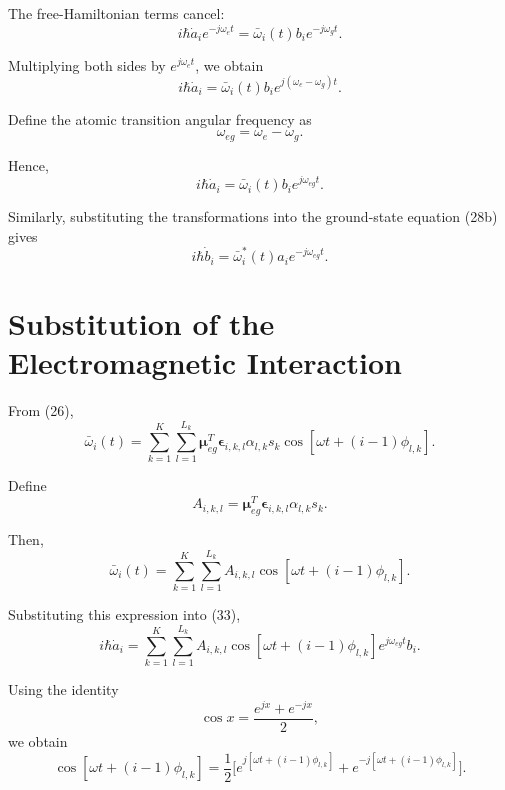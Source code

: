 \documentclass[12pt,a4paper]{article}
\begin{document}
The free-Hamiltonian terms cancel:
\[
i\hbar\dot a_i e^{-j\omega_e t}
=
\bar{\omega}_i(t)b_i e^{-j\omega_g t}.
\]

Multiplying both sides by
\(e^{j\omega_e t}\),
we obtain
\[
i\hbar\dot a_i
=
\bar{\omega}_i(t)b_i
e^{j(\omega_e-\omega_g)t}.
\]

Define the atomic transition angular frequency as
\begin{equation}
\boxed{
\omega_{eg}
=
\omega_e-\omega_g.
}
\tag{32}
\end{equation}

Hence,
\begin{equation}
\boxed{
i\hbar\dot a_i
=
\bar{\omega}_i(t)
b_i
e^{j\omega_{eg}t}.
}
\tag{33}
\end{equation}

Similarly, substituting the transformations into the ground-state
equation (28b) gives
\begin{equation}
\boxed{
i\hbar\dot b_i
=
\bar{\omega}_i^{*}(t)
a_i
e^{-j\omega_{eg}t}.
}
\tag{34}
\end{equation}

\section{Substitution of the Electromagnetic Interaction}

From (26),
\[
\bar{\omega}_i(t)
=
\sum_{k=1}^{K}
\sum_{l=1}^{L_k}
\boldsymbol{\mu}_{eg}^{T}
\boldsymbol{\epsilon}_{i,k,l}
\alpha_{l,k}s_k
\cos
\left[
\omega t+(i-1)\phi_{l,k}
\right].
\]

Define
\begin{equation}
\boxed{
A_{i,k,l}
=
\boldsymbol{\mu}_{eg}^{T}
\boldsymbol{\epsilon}_{i,k,l}
\alpha_{l,k}s_k.
}
\tag{35}
\end{equation}

Then,
\[
\bar{\omega}_i(t)
=
\sum_{k=1}^{K}
\sum_{l=1}^{L_k}
A_{i,k,l}
\cos
\left[
\omega t+(i-1)\phi_{l,k}
\right].
\]

Substituting this expression into (33),
\[
i\hbar\dot a_i
=
\sum_{k=1}^{K}
\sum_{l=1}^{L_k}
A_{i,k,l}
\cos
\left[
\omega t+(i-1)\phi_{l,k}
\right]
e^{j\omega_{eg}t}
b_i.
\]

Using the identity
\[
\cos x
=
\frac{e^{jx}+e^{-jx}}{2},
\]
we obtain
\[
\cos
\left[
\omega t+(i-1)\phi_{l,k}
\right]
=
\frac{1}{2}
\Big[
e^{j[\omega t+(i-1)\phi_{l,k}]}
+
e^{-j[\omega t+(i-1)\phi_{l,k}]}
\Big].
\]
\end{document}
